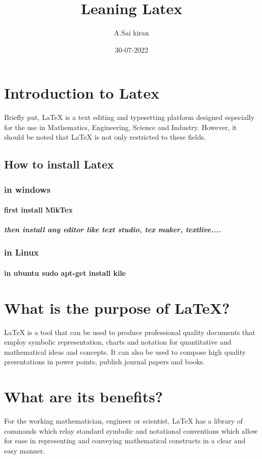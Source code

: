 \documentclass[12pt]{article}
\title{Leaning Latex}
\author{A.Sai kiran}
\date{30-07-2022}
\begin{document}
\maketitle
\tableofcontents
\section{Introduction to Latex}

Briefly put, LaTeX is a text editing and typesetting platform designed
especially for the use in Mathematics, Engineering, Science and Industry.
However, it should be noted that LaTeX is not only restricted to these
fields.
\subsection{How to install Latex}
\subsubsection{in windows}
\paragraph{first install MikTex}
\subparagraph{then install any editor like text studio, tex maker, textlive....}
\subsubsection{in Linux}
\paragraph{in ubuntu sudo apt-get install kile}

\section{What is the purpose of LaTeX?}
LaTeX is a tool that can be used to produce professional quality
documents that employ symbolic representation, charts and notation for
quantitative and mathematical ideas and concepts. It can also be used to
compose high quality presentations in power points, publish journal papers
and books.
\section{What are its benefits?}


For the working mathematician, engineer or scientist, LaTeX has a library
of commands which relay standard symbolic and notational conventions
which allow for ease in representing and conveying mathematical
constructs in a clear and easy manner.
\end{document}
